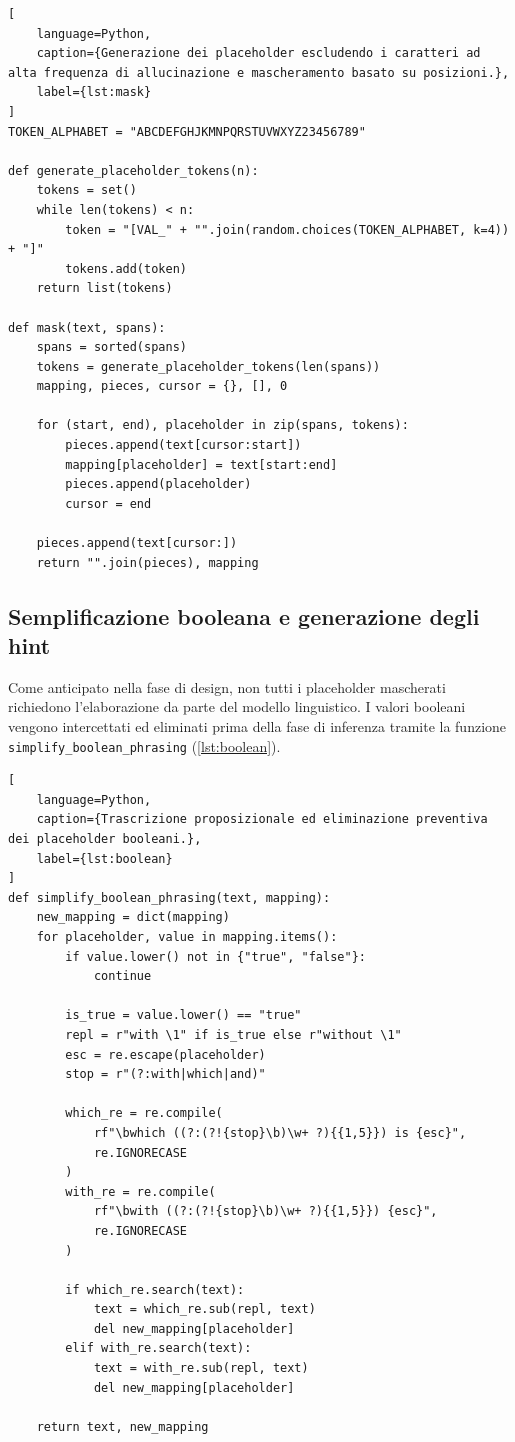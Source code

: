 \documentclass[12pt,a4paper,openright,twoside]{book}
\begin{document}
\begin{lstlisting}[
    language=Python,
    caption={Generazione dei placeholder escludendo i caratteri ad alta frequenza di allucinazione e mascheramento basato su posizioni.},
    label={lst:mask}
]
TOKEN_ALPHABET = "ABCDEFGHJKMNPQRSTUVWXYZ23456789"

def generate_placeholder_tokens(n):
    tokens = set()
    while len(tokens) < n:
        token = "[VAL_" + "".join(random.choices(TOKEN_ALPHABET, k=4)) + "]"
        tokens.add(token)
    return list(tokens)

def mask(text, spans):
    spans = sorted(spans)
    tokens = generate_placeholder_tokens(len(spans))
    mapping, pieces, cursor = {}, [], 0
    
    for (start, end), placeholder in zip(spans, tokens):
        pieces.append(text[cursor:start])
        mapping[placeholder] = text[start:end]
        pieces.append(placeholder)
        cursor = end
        
    pieces.append(text[cursor:])
    return "".join(pieces), mapping
\end{lstlisting}

\subsection{Semplificazione booleana e generazione degli hint}
\label{sec:impl-boolean-hints}

Come anticipato nella fase di design, non tutti i placeholder mascherati
richiedono l'elaborazione da parte del modello linguistico. I valori booleani
vengono intercettati ed eliminati prima della fase di inferenza tramite la
funzione \texttt{simplify\_boolean\_phrasing} (\cref{lst:boolean}).

\begin{lstlisting}[
    language=Python,
    caption={Trascrizione proposizionale ed eliminazione preventiva dei placeholder booleani.},
    label={lst:boolean}
]
def simplify_boolean_phrasing(text, mapping):
    new_mapping = dict(mapping)
    for placeholder, value in mapping.items():
        if value.lower() not in {"true", "false"}:
            continue
            
        is_true = value.lower() == "true"
        repl = r"with \1" if is_true else r"without \1"
        esc = re.escape(placeholder)
        stop = r"(?:with|which|and)"
        
        which_re = re.compile(
            rf"\bwhich ((?:(?!{stop}\b)\w+ ?){{1,5}}) is {esc}", 
            re.IGNORECASE
        )
        with_re = re.compile(
            rf"\bwith ((?:(?!{stop}\b)\w+ ?){{1,5}}) {esc}", 
            re.IGNORECASE
        )
        
        if which_re.search(text):
            text = which_re.sub(repl, text)
            del new_mapping[placeholder]
        elif with_re.search(text):
            text = with_re.sub(repl, text)
            del new_mapping[placeholder]
            
    return text, new_mapping
\end{lstlisting}
\end{document}
